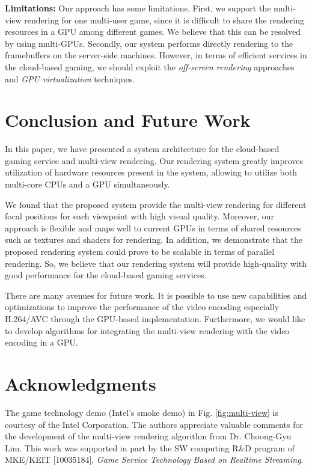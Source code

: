 \documentclass[conference]{IEEEtran}
\begin{document}
    \noindent
    {\bf Limitations:}
    Our approach has some limitations.
    First, we support the multi-view rendering for one multi-user game, since it is difficult to share the rendering resources in a GPU among different games. We believe that this can be resolved by using multi-GPUs.
    Secondly, our system performs directly rendering to the framebuffers on the server-side machines.
    However, in terms of efficient services in the cloud-based gaming, we should exploit the \emph{off-screen rendering} approaches and \emph{GPU virtualization} techniques.

    \section{Conclusion and Future Work}
    \label{sc:Conclusion}
    In this paper, we have presented a system architecture for the cloud-based gaming service and multi-view rendering.
    Our rendering system greatly improves utilization of hardware resources present in the system, allowing to utilize both multi-core CPUs and a GPU simultaneously.

    We found that the proposed system provide the multi-view rendering for different focal positions for each viewpoint with high visual quality.
    Moreover, our approach is flexible and maps well to current GPUs in terms of shared resources such as textures and shaders for rendering.
    In addition, we demonstrate that the proposed rendering system could prove to be scalable in terms of parallel rendering. So, we believe that our rendering system will provide high-quality with good performance for the cloud-based gaming services.

    There are many avenues for future work. It is possible to use new capabilities and optimizations to improve the performance of the video encoding especially H.264/AVC through the GPU-based implementation.
    Furthermore, we would like to develop algorithms for integrating the multi-view rendering with the video encoding in a GPU.

    \section*{Acknowledgments}
    \label{sc:Acknowledgment}
    The game technology demo (Intel's smoke demo) in Fig. \ref{fig:multi-view} is courtesy of the Intel Corporation.
    The authors appreciate valuable comments for the development of the multi-view rendering algorithm from Dr. Choong-Gyu Lim.
    This work was supported in part by the SW computing R\&D program of MKE/KEIT [10035184], \emph{Game Service Technology Based on Realtime Streaming}.

    
    


    
\end{document}
